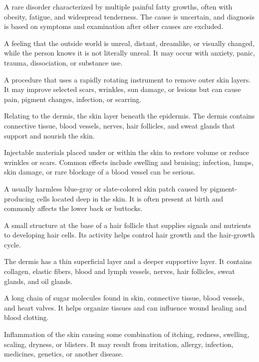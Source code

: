  A rare disorder characterized by multiple painful fatty growths, often with obesity, fatigue, and widespread tenderness. The cause is uncertain, and diagnosis is based on symptoms and examination after other causes are excluded.

 A feeling that the outside world is unreal, distant, dreamlike, or visually changed, while the person knows it is not literally unreal. It may occur with anxiety, panic, trauma, dissociation, or substance use.

 A procedure that uses a rapidly rotating instrument to remove outer skin layers. It may improve selected scars, wrinkles, sun damage, or lesions but can cause pain, pigment changes, infection, or scarring.

 Relating to the dermis, the skin layer beneath the epidermis. The dermis contains connective tissue, blood vessels, nerves, hair follicles, and sweat glands that support and nourish the skin.

 Injectable materials placed under or within the skin to restore volume or reduce wrinkles or scars. Common effects include swelling and bruising; infection, lumps, skin damage, or rare blockage of a blood vessel can be serious.

 A usually harmless blue-gray or slate-colored skin patch caused by pigment-producing cells located deep in the skin. It is often present at birth and commonly affects the lower back or buttocks.

 A small structure at the base of a hair follicle that supplies signals and nutrients to developing hair cells. Its activity helps control hair growth and the hair-growth cycle.

 The dermis has a thin superficial layer and a deeper supportive layer. It contains collagen, elastic fibers, blood and lymph vessels, nerves, hair follicles, sweat glands, and oil glands.

 A long chain of sugar molecules found in skin, connective tissue, blood vessels, and heart valves. It helps organize tissues and can influence wound healing and blood clotting.

 Inflammation of the skin causing some combination of itching, redness, swelling, scaling, dryness, or blisters. It may result from irritation, allergy, infection, medicines, genetics, or another disease.

